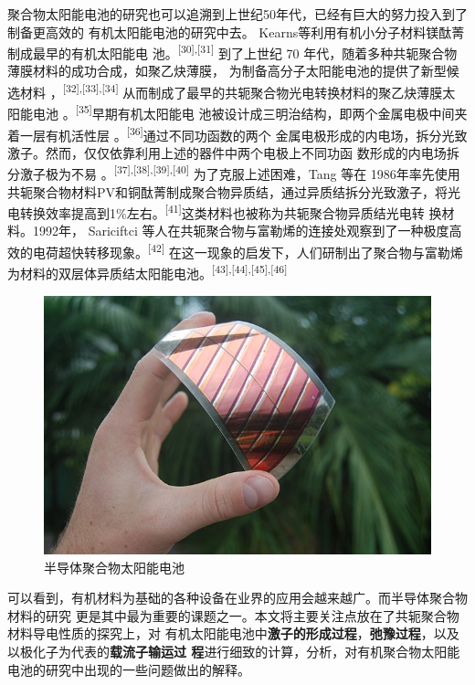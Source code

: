 \documentclass[12pt,]{report}
\begin{document}
聚合物太阳能电池的研究也可以追溯到上世纪50年代，已经有巨大的努力投入到了制备更高效的
有机太阳能电池的研究中去。
Kearns等利用有机小分子材料镁酞菁制成最早的有机太阳能电
池。\textsuperscript{{[}30{]},{[}31{]}} 到了上世纪 70
年代，随着多种共轭聚合物薄膜材料的成功合成，如聚乙炔薄膜，
为制备高分子太阳能电池的提供了新型候选材料
，\textsuperscript{{[}32{]},{[}33{]},{[}34{]}}
从而制成了最早的共轭聚合物光电转换材料的聚乙炔薄膜太阳能电池
。\textsuperscript{{[}35{]}}早期有机太阳能电
池被设计成三明治结构，即两个金属电极中间夹着一层有机活性层
。\textsuperscript{{[}36{]}}通过不同功函数的两个
金属电极形成的内电场，拆分光致激子。然而，仅仅依靠利用上述的器件中两个电极上不同功函
数形成的内电场拆分激子极为不易
。\textsuperscript{{[}37{]},{[}38{]},{[}39{]},{[}40{]}}
为了克服上述困难，Tang 等在
1986年率先使用共轭聚合物材料PV和铜酞菁制成聚合物异质结，通过异质结拆分光致激子，将光
电转换效率提高到1\%左右。\textsuperscript{{[}41{]}}这类材料也被称为共轭聚合物异质结光电转
换材料。1992年， Sariciftci
等人在共轭聚合物与富勒烯的连接处观察到了一种极度高效的电荷超快转移现象。\textsuperscript{{[}42{]}}
在这一现象的启发下，人们研制出了聚合物与富勒烯为材料的双层体异质结太阳能电池。\textsuperscript{{[}43{]},{[}44{]},{[}45{]},{[}46{]}}

\begin{figure}[h!]
    \centering
    \includegraphics[scale=0.5]{./figures/solarcell.jpg}
    \caption{半导体聚合物太阳能电池}
    \label{fig:solarcell}
\end{figure}

可以看到，有机材料为基础的各种设备在业界的应用会越来越广。而半导体聚合物材料的研究
更是其中最为重要的课题之一。本文将主要关注点放在了共轭聚合物材料导电性质的探究上，对
有机太阳能电池中\textbf{激子的形成过程}，\textbf{弛豫过程}，以及以极化子为代表的\textbf{载流子输运过
程}进行细致的计算，分析，对有机聚合物太阳能电池的研究中出现的一些问题做出的解释。
\end{document}
